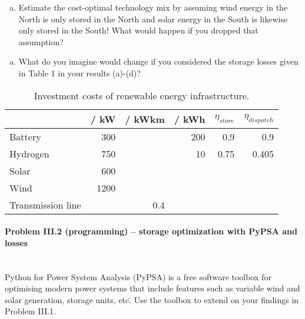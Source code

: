 \documentclass[11pt,a4paper,fleqn]{scrartcl}
\newcommand{\eur}{\text{\EUR{}}}
\begin{document}
\begin{enumerate}[(e)]
	\item   Estimate the cost-optimal technology mix by assuming wind energy in the North is only stored in the North and solar energy in the South is likewise only stored in the South! What would happen if you dropped that assumption?
\end{enumerate}
\begin{enumerate}[(f)]
	\item What do you imagine would change if you considered the storage losses given in Table 1 in your results (a)-(d)?
\end{enumerate}

\begin{table}[h]
 \centering
 \label{tab:prices}
 \begin{tabular}{@{}lrrrrr@{}}
  \toprule
                             & \eur / kW & \eur / kWkm & \eur / kWh & $\eta_{store}$ & $\eta_{dispatch}$ \\ \midrule
  Battery                    & 300         & & 200          & 0.9            & 0.9               \\
  Hydrogen                   & 750         & & 10           & 0.75           & 0.405              \\
  Solar                      & 600         & &              &                &                   \\
  Wind                       & 1200        & &              &                &                   \\
  Transmission line &          & 0.4 &              &                &                   \\ \bottomrule
 \end{tabular}
 \caption{Investment costs of renewable energy infrastructure.}
\end{table}

\newpage
\paragraph{Problem III.2 (programming) -- storage optimization with PyPSA and losses \faGroup}~\\

Python for Power System Analysis (PyPSA) is a free software toolbox for optimising modern power systems that include features such as variable wind and solar generation, storage units, etc\.. Use the toolbox to extend on your findings in Problem III.1.
\end{document}
